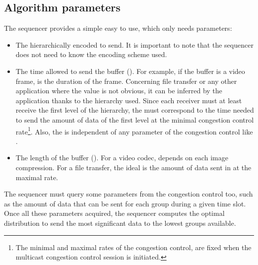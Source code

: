 \documentclass[a4paper]{article}
\begin{document}
    \subsection{Algorithm parameters}
        The sequencer provides a simple  easy to use, which only needs 
        parameters:
        \begin{itemize}
            \item{
                The hierarchically encoded  to send. It is important to
                    note that the sequencer does not need to know the 
                    encoding scheme used.
            }
            \item{
                The time allowed to send the buffer (). For
                    example, if the buffer is a video frame,  is
                    the duration of the frame.
Concerning file transfer or any other application where the
                     value is not obvious, it can be inferred by
                    the application thanks to the hierarchy used.  Since each
                    receiver must at least receive the first level of the
                    hierarchy, the  must correspond to the time
                    needed to send the amount of data of the first level at the
                    minimal congestion control rate\footnote{
                        The minimal and maximal rates of the congestion control,
                            are fixed when the multicast congestion control
                                session is initiated.
                    }.
Also, the  is independent of any parameter of
                    the congestion control like .
            }
            \item{
                The length of the buffer ().  For a video codec,
                     depends on each image compression.  For a
                        file transfer, the ideal  is the amount
                        of data sent in  at the maximal
                        rate\footnotemark[\value{footnote}].
            }
        \end{itemize}
        The sequencer must query some parameters from the congestion control
        too, such as the amount of data that can be sent for each group during a
        given time slot.
Once all these parameters acquired, the sequencer computes the optimal
        distribution to send the most significant data to the lowest groups
        available.
\end{document}
